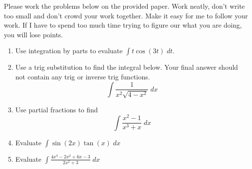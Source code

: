 \documentclass[12pt,letterpaper,fleqn]{article}
\newcommand{\ds}{\displaystyle}
\theoremstyle{definition}
\begin{document}
Please work the problems below on the provided paper. Work neatly, don’t write too small and don’t crowd your work together. Make it easy for me to follow your work. If I have to spend too much time trying to figure our what you are doing, you will lose points.

\begin{enumerate}
 \item Use integration by parts to evaluate \;$\ds\int t \cos(3t)\;dt$.
 \item Use a trig substitution to find the integral below.
       Your final answer should not contain any trig or inverse trig functions.
       \begin{equation*}
        \int\frac{1}{x^2\sqrt{4 - x^2}}\;dx
       \end{equation*}
 \item Use partial fractions to find
       \begin{equation*}
        \int\frac{x^2-1}{x^3+x}\;dx
       \end{equation*}
 \item Evaluate \; $\ds\int \sin(2x)\tan(x)\;dx$
 \item Evaluate \; $\ds\int\frac{4x^3 - 2x^2 + 6x - 3}{2x^2 + 3}\;dx$
\end{enumerate}
\end{document}
